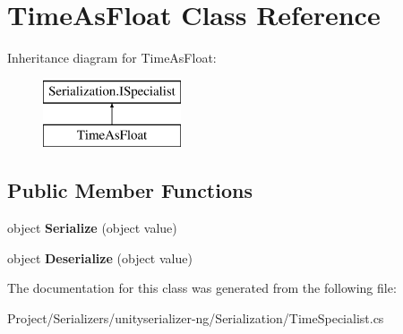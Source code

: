 \hypertarget{class_time_as_float}{}\section{Time\+As\+Float Class Reference}
\label{class_time_as_float}
Inheritance diagram for Time\+As\+Float\+:\begin{figure}[H]
\begin{center}
\leavevmode
\includegraphics[height=2.000000cm]{class_time_as_float}
\end{center}
\end{figure}
\subsection*{Public Member Functions}
\begin{DoxyCompactItemize}
\item 
\mbox{\label{class_time_as_float_a2c67f320572b03fa73fbdd206d7fe65f}} 
object {\bfseries Serialize} (object value)
\item 
\mbox{\label{class_time_as_float_a5f464ebb741e90aae50b8fdffe49b022}} 
object {\bfseries Deserialize} (object value)
\end{DoxyCompactItemize}


The documentation for this class was generated from the following file\+:\begin{DoxyCompactItemize}
\item 
Project/\+Serializers/unityserializer-\/ng/\+Serialization/Time\+Specialist.\+cs\end{DoxyCompactItemize}
